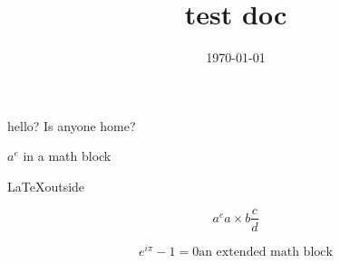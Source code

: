 \documentclass[11pt]{article}
\date{\today}
\title{test doc}
\begin{document}
\maketitle
\tableofcontents

hello? Is anyone home?

\(a^e\) in a math block

\LaTeX outside

\[ a^e a \times b \frac{c}{d} \]

\[
e^{i \pi} -1 = 0
\text{an extended math block}
\]
\end{document}
